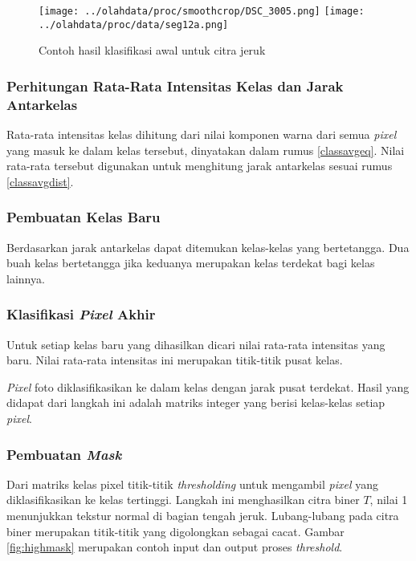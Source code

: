 \documentclass[laporan.tex]{subfiles}
\begin{document}
\begin{figure}[h]
\centering
\texttt{[image: ../olahdata/proc/smoothcrop/DSC\_3005.png]} \qquad
\texttt{[image: ../olahdata/proc/data/seg12a.png]}
\caption{Contoh hasil klasifikasi awal untuk citra jeruk}
\label{fig:preclassex}
\end{figure}

\subsubsection{Perhitungan Rata-Rata Intensitas Kelas dan Jarak Antarkelas}

Rata-rata intensitas kelas dihitung dari nilai komponen warna dari semua \emph{pixel} yang masuk ke dalam kelas tersebut, dinyatakan dalam rumus \ref{classavgeq}. Nilai rata-rata tersebut digunakan untuk menghitung jarak antarkelas sesuai rumus \ref{classavgdist}.

\subsubsection{Pembuatan Kelas Baru}

Berdasarkan jarak antarkelas dapat ditemukan kelas-kelas yang bertetangga. Dua buah kelas bertetangga jika keduanya merupakan kelas terdekat bagi kelas lainnya.

\subsubsection{Klasifikasi \emph{Pixel} Akhir}

Untuk setiap kelas baru yang dihasilkan dicari nilai rata-rata intensitas yang baru. Nilai rata-rata intensitas ini merupakan titik-titik pusat kelas.

\emph{Pixel} foto diklasifikasikan ke dalam kelas dengan jarak pusat terdekat. Hasil yang didapat dari langkah ini adalah matriks integer yang berisi kelas-kelas setiap \emph{pixel}.

\subsubsection{Pembuatan \emph{Mask}}

Dari matriks kelas pixel titik-titik \emph{thresholding} untuk mengambil \emph{pixel} yang diklasifikasikan ke kelas tertinggi. Langkah ini menghasilkan citra biner $T$, nilai 1 menunjukkan tekstur normal di bagian tengah jeruk. Lubang-lubang pada citra biner merupakan titik-titik yang digolongkan sebagai cacat. Gambar \ref{fig:highmask} merupakan contoh input dan output proses \emph{threshold}.
\end{document}
